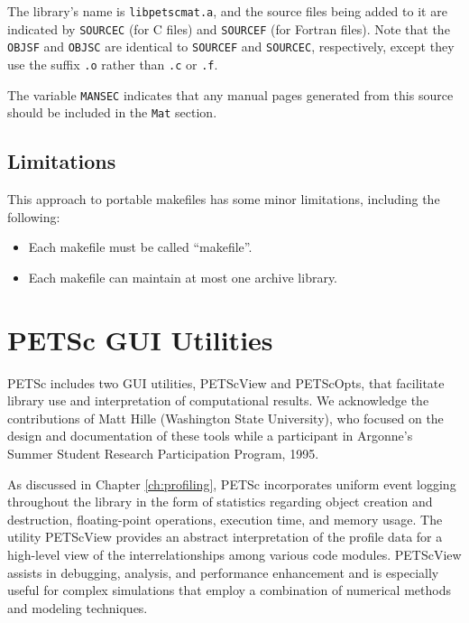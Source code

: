 {The library's name is {\tt libpetscmat.a}, and the source files being added
to it are indicated by {\tt SOURCEC} (for C files) and {\tt SOURCEF} (for 
Fortran files). Note that the {\tt OBJSF} and {\tt OBJSC} are identical 
to {\tt SOURCEF} and {\tt SOURCEC}, respectively, except they use the
suffix {\tt .o} rather than {\tt .c} or {\tt .f}. 

The variable {\tt MANSEC} indicates that any manual pages generated
from this source should be included in the {\tt Mat} section. 

\section{Limitations}

This approach to portable makefiles has some minor limitations, including
the following:
\begin{itemize}
\item Each makefile must be called ``makefile''.
\item Each makefile can maintain at most one archive library.
\end{itemize}



\chapter{PETSc GUI Utilities}
\label{ch:petsc_gui}

PETSc includes two GUI utilities, PETScView and PETScOpts, that
facilitate library use and interpretation of computational results.
We acknowledge the contributions of Matt Hille (Washington State
University), who focused on the design and documentation of these
tools while a participant in Argonne's Summer Student Research
Participation Program, 1995.

As discussed in Chapter \ref{ch:profiling}, PETSc incorporates uniform
event logging throughout the library in the form of statistics
regarding object creation and destruction, floating-point operations,
execution time, and memory usage.  The utility PETScView provides an
abstract interpretation of the profile data for a high-level view of
the interrelationships among various code modules.  PETScView assists
in debugging, analysis, and performance enhancement and is especially
useful for complex simulations that employ a combination of numerical
methods and modeling techniques.

}
